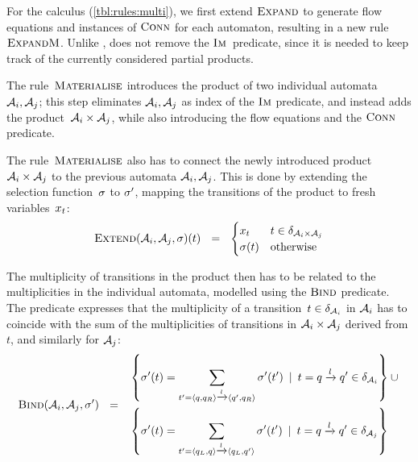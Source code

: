 \documentclass[acmsmall,review,anonymous,screen]{acmart}\settopmatter{printfolios=true,printccs=true,printacmref=true}
\theoremstyle{definition}
\begin{document}
    For the calculus (\cref{tbl:rules:multi}), we first extend
    $\textsc{Expand}$ to generate flow equations and instances of $\operatorname{\textsc{Conn}}$
    for each automaton, resulting in a new rule $\textsc{ExpandM}$.  Unlike
    \Expand{}, \ExpandM{} does not remove the $\operatorname{\textsc{Im}}$~predicate,
    since it is needed to keep track of the currently considered
    partial products.

The rule~$\textsc{Materialise}$ introduces the product of two individual
automata~$\mathcal{A}_i, \mathcal{A}_j$; this step eliminates
$\mathcal{A}_i, \mathcal{A}_j$ as index of the $\operatorname{\textsc{Im}}$ predicate, and
instead adds the product~$\mathcal{A}_i \times \mathcal{A}_j$, while
also introducing the flow equations and the $\operatorname{\textsc{Conn}}$ predicate.

The rule~$\textsc{Materialise}$ also has to connect the newly introduced
product~$\mathcal{A}_i \times \mathcal{A}_j$ to the previous automata
$\mathcal{A}_i, \mathcal{A}_j$. This is done by extending the
selection function~$\operatorname{\sigma}$ to $\operatorname{\sigma}'$, mapping the transitions of the product
to fresh variables~$x_{t}$:
\begin{equation*}
  \textsc{Extend}(\mathcal{A}_i, \mathcal{A}_j,\sigma)(t)
  ~~=~~
  \begin{cases}
    x_{t} & t \in \delta_{\mathcal{A}_i \times \mathcal{A}_j}
    \\
    \operatorname{\sigma}(t) & \text{otherwise}
  \end{cases}
\end{equation*}

The multiplicity of transitions in the product then has to be related
to the multiplicities in the individual automata, modelled using the
$\textsc{Bind}$ predicate. The predicate expresses that the multiplicity
of a transition~$t \in \delta_{\mathcal{A}_i}$ in
$\mathcal{A}_i$ has to coincide with the sum of the multiplicities of
transitions in $\mathcal{A}_i \times \mathcal{A}_j$ derived from $t$,
and similarly for $\mathcal{A}_j$:
%
  $$
  \textsc{Bind}(\mathcal{A}_i, \mathcal{A}_j, \operatorname{\sigma}') ~~=~~
  \begin{aligned}
  & \left\{ 
    \operatorname{\sigma}'(t)  =  \sum\limits_{t' = \left\langle q, q_R\right\rangle \xrightarrow{l} \left\langle q', q_R\right\rangle} \operatorname{\sigma}'(t')
  \:\mid\: t = q \xrightarrow{l} q' \in \delta_{\mathcal{A}_i} \right\} \cup\mbox{} \\ 
  & \left\{
    \operatorname{\sigma}'(t)  =  \sum\limits_{t' = \left\langle q_L, q\right\rangle \xrightarrow{l} \left\langle q_L, q'\right\rangle} \operatorname{\sigma}'(t') \:\mid\: t = q \xrightarrow{l} q' \in \delta_{\mathcal{A}_j}
  \right\}
  \end{aligned}
$$
\end{document}
